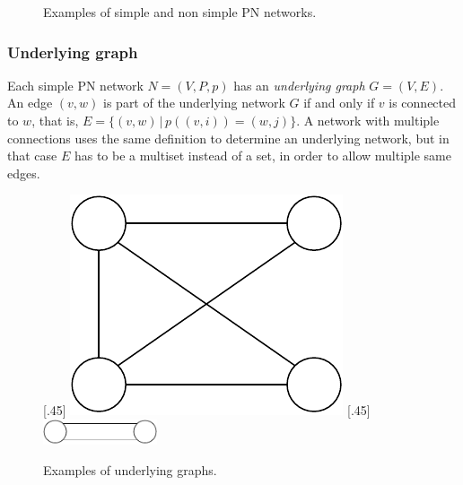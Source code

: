 \begin{figure}[H]
{  }
  \caption{Examples of simple and non simple PN networks.}
  \label{fig:formal_pn2}
\end{figure}


\subsubsection{Underlying graph}

Each simple PN network $N=(V,P,p)$ has an \emph{underlying graph} $G=(V,E)$.
An edge $(v, w)$ is part of the underlying network $G$ if and only if $v$ is connected to $w$, that is, $E = \{ (v, w) \, | \,  p((v, i)) = (w, j) \}$.
A network with multiple connections uses the same definition to determine an underlying network, but in that case $E$ has to be a multiset instead of a set, in order to allow multiple same edges.

\begin{figure}[H]
    [.45\linewidth] {
    \centering
    \includegraphics[scale=0.6]{diagrams/formalizing_pn_network_underlying_graph_1.pdf}
  }
  \hfill
    [.45\linewidth] {
    \centering
    \includegraphics[width=0.3\textwidth]{diagrams/formalizing_pn_network_underlying_graph_2.pdf}
  }
  \caption{Examples of underlying graphs.}
  \label{fig:underlying_graphs1}
\end{figure}

